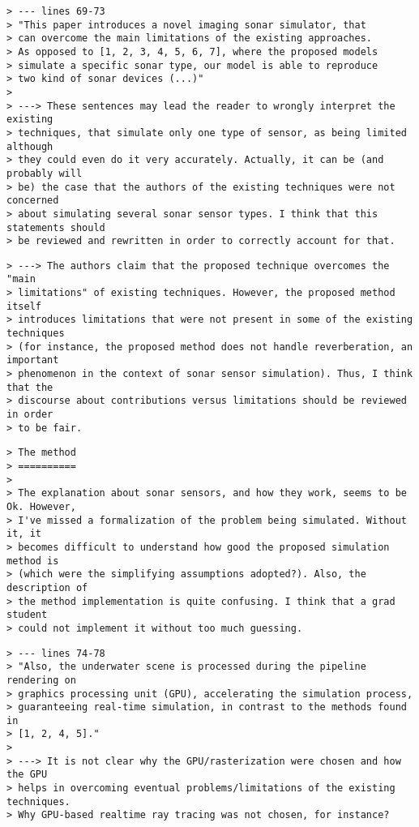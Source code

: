 \documentclass{article}
\begin{document}

\begin{verbatim}
> --- lines 69-73
> "This paper introduces a novel imaging sonar simulator, that
> can overcome the main limitations of the existing approaches.
> As opposed to [1, 2, 3, 4, 5, 6, 7], where the proposed models
> simulate a specific sonar type, our model is able to reproduce
> two kind of sonar devices (...)"
>
> ---> These sentences may lead the reader to wrongly interpret the existing
> techniques, that simulate only one type of sensor, as being limited although
> they could even do it very accurately. Actually, it can be (and probably will
> be) the case that the authors of the existing techniques were not concerned
> about simulating several sonar sensor types. I think that this statements should
> be reviewed and rewritten in order to correctly account for that.
\end{verbatim}


\begin{verbatim}
> ---> The authors claim that the proposed technique overcomes the "main
> limitations" of existing techniques. However, the proposed method itself
> introduces limitations that were not present in some of the existing techniques
> (for instance, the proposed method does not handle reverberation, an important
> phenomenon in the context of sonar sensor simulation). Thus, I think that the
> discourse about contributions versus limitations should be reviewed in order
> to be fair.
\end{verbatim}


\begin{verbatim}
> The method
> ==========
>
> The explanation about sonar sensors, and how they work, seems to be Ok. However,
> I've missed a formalization of the problem being simulated. Without it, it
> becomes difficult to understand how good the proposed simulation method is
> (which were the simplifying assumptions adopted?). Also, the description of
> the method implementation is quite confusing. I think that a grad student
> could not implement it without too much guessing.
\end{verbatim}


\begin{verbatim}
> --- lines 74-78
> "Also, the underwater scene is processed during the pipeline rendering on
> graphics processing unit (GPU), accelerating the simulation process,
> guaranteeing real-time simulation, in contrast to the methods found in
> [1, 2, 4, 5]."
>
> ---> It is not clear why the GPU/rasterization were chosen and how the GPU
> helps in overcoming eventual problems/limitations of the existing techniques.
> Why GPU-based realtime ray tracing was not chosen, for instance?
\end{verbatim}
\end{document}
